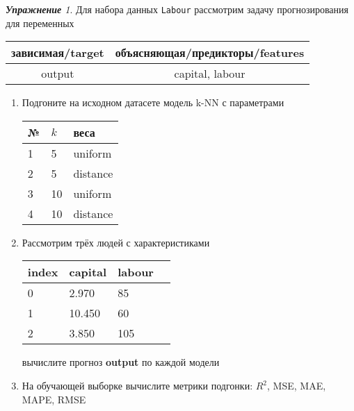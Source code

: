 \documentclass[a4,12pt]{article}
\theoremstyle{remark}
\newtheorem{exercise}{\textbf{Упражнение}}[section]
\begin{document}
\begin{exercise}
Для набора данных \texttt{Labour} рассмотрим задачу прогнозирования
для переменных
\begin{center}
	\begin{tabular}{|c|c|}\hline
		зависимая/target & объясняющая/предикторы/features \\ \hline
		output & capital, labour \\ \hline
	\end{tabular}
\end{center}
\begin{enumerate}
	\item Подгоните на исходном датасете модель k-NN с параметрами
	\begin{center}
		\begin{tabular}{|l|l|l|}\hline
		№ & \(k\) & веса \\ \hline
		1 & 5 & uniform \\
		2 & 5 & distance \\
		3 & 10 & uniform \\
		4 & 10 & distance \\ \hline
		\end{tabular}
	\end{center}
	\item Рассмотрим трёх людей с характеристиками
	\begin{center}
		\begin{tabular}{|l||l||l|l|}\hline
			index & capital & labour \\ \hline\hline
			0 & 2.970 & 85 \\
			1 & 10.450 & 60  \\
			2 & 3.850 & 105 \\ \hline
		\end{tabular}
	\end{center}
	вычислите прогноз \textbf{output} по каждой модели

	\item На обучающей выборке вычислите метрики подгонки: \(R^2\), 
	MSE, MAE, MAPE, RMSE
\end{enumerate}
\end{exercise}
\end{document}

